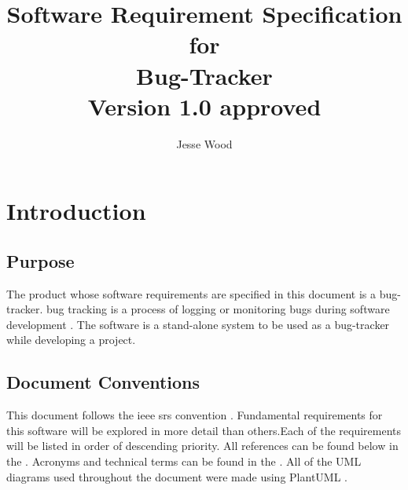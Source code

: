 \documentclass{article}
\newcommand{\comment}[1]{}
\begin{document}
\title{
	Software Requirement Specification\\
	for \\
	Bug-Tracker \\
	Version 1.0 approved
}
\author{Jesse Wood}
\maketitle
\newpage

\tableofcontents \label{contents}
\newpage
\section{Introduction}
\subsection{Purpose}
\comment{
	Identify the product whose software requirements are specified in this document, including the revision or release number. Describe the scope of the product that is covered by the SRS. Particularly if this SRS describes only part of the system or a single subsytem.
	}
The product whose software requirements are specified in this document is a \Gls{bug}-tracker. \Gls{bug} tracking is a process of logging or monitoring bugs during software development \parencite{ibm20}. The software is a stand-alone system to be used as a bug-tracker while developing a project.
\subsection{Document Conventions}
\comment{
	Decribe any standards of typographical conventions that were followed when writing this \acrlong{srs}, such as fonts or highlighting that have special significance. For exmaple, state whether priorites for higher-level requirements are assumed to be inheritied by detailed requirements, or whether every requirement statement is to have its own priorities.
	}
This document follows the \acrshort{ieee} \acrshort{srs} convention \parencite{ieee20}. Fundamental requirements for this software will be explored in more detail than others.Each of the requirements will be listed in order of descending priority. All references can be found below in the . Acronyms and technical terms can be found in the . All of the UML diagrams used throughout the document were made using PlantUML \parencite{plantuml20}.
\end{document}
